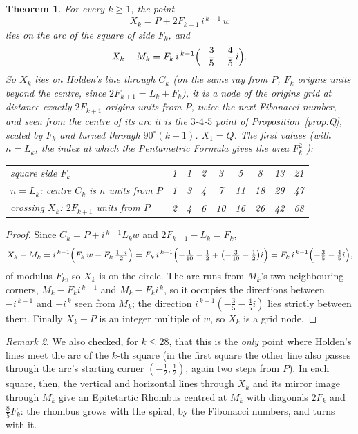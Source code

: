 \documentclass[11pt,a4paper]{article}
\theoremstyle{plain}
\newtheorem{theorem}{Theorem}
\theoremstyle{definition}
\theoremstyle{remark}
\newtheorem{remark}[theorem]{Remark}
\begin{document}
\begin{theorem}\label{thm:every}
For every $k\ge 1$, the point
\[
  X_k = P + 2F_{k+1}\, i^{\,k-1}\, w
\]
lies on the arc of the square of side $F_k$, and
\[
  X_k - M_k = F_k\, i^{\,k-1}\Bigl(-\frac35-\frac45\,i\Bigr).
\]
So $X_k$ lies on Holden's line through $C_k$ (on the same ray from $P$, $F_k$ origins units beyond the centre, since $2F_{k+1}=L_k+F_k$), it is a node of the origins grid at distance exactly $2F_{k+1}$ origins units from $P$, \emph{twice the next Fibonacci number}, and seen from the centre of its arc it is the $3$-$4$-$5$ point of Proposition~\ref{prop:Q}, scaled by $F_k$ and turned through $90^\circ(k-1)$. $X_1=Q$. The first values (with $n=L_k$, the index at which the Pentametric Formula gives the area $F_k^2$ \cite{gt}):
\begin{center}\small
\begin{tabular}{lcccccccc}
square side $F_k$ & 1 & 1 & 2 & 3 & 5 & 8 & 13 & 21\\
$n = L_k$: centre $C_k$ is $n$ units from $P$ & 1 & 3 & 4 & 7 & 11 & 18 & 29 & 47\\
crossing $X_k$: $2F_{k+1}$ units from $P$ & 2 & 4 & 6 & 10 & 16 & 26 & 42 & 68\\
\end{tabular}
\end{center}
\end{theorem}

\begin{proof}
Since $C_k = P + i^{\,k-1}L_k w$ and $2F_{k+1}-L_k = F_k$,
\[
  X_k - M_k = i^{\,k-1}\Bigl(F_k\,w - F_k\,\tfrac{1+i}{2}\Bigr) = F_k\, i^{\,k-1}\Bigl(-\tfrac{1}{10}-\tfrac12 + \bigl(-\tfrac{3}{10}-\tfrac12\bigr) i\Bigr) = F_k\, i^{\,k-1}\Bigl(-\tfrac35-\tfrac45 i\Bigr),
\]
of modulus $F_k$, so $X_k$ is on the circle. The arc runs from $M_k$'s two neighbouring corners, $M_k - F_k i^{\,k-1}$ and $M_k - F_k i^{\,k}$, so it occupies the directions between $-i^{\,k-1}$ and $-i^{\,k}$ seen from $M_k$; the direction $i^{\,k-1}(-\tfrac35-\tfrac45 i)$ lies strictly between them. Finally $X_k - P$ is an integer multiple of $w$, so $X_k$ is a grid node.
\end{proof}

\begin{remark}
We also checked, for $k\le 28$, that this is the \emph{only} point where Holden's lines meet the arc of the $k$-th square (in the first square the other line also passes through the arc's starting corner $(-\tfrac12,\tfrac12)$, again two steps from $P$). In each square, then, the vertical and horizontal lines through $X_k$ and its mirror image through $M_k$ give an Epitetartic Rhombus centred at $M_k$ with diagonals $2F_k$ and $\tfrac85 F_k$: the rhombus grows with the spiral, by the Fibonacci numbers, and turns with it.
\end{remark}
\end{document}
